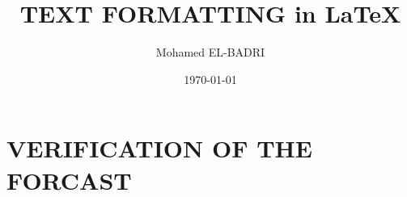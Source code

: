\documentclass[12pt]{article}
\title{TEXT FORMATTING in \LaTeX}
\author{Mohamed EL-BADRI}
\date{\today}
\begin{document}
	\section{VERIFICATION OF THE FORCAST}
\end{document}
